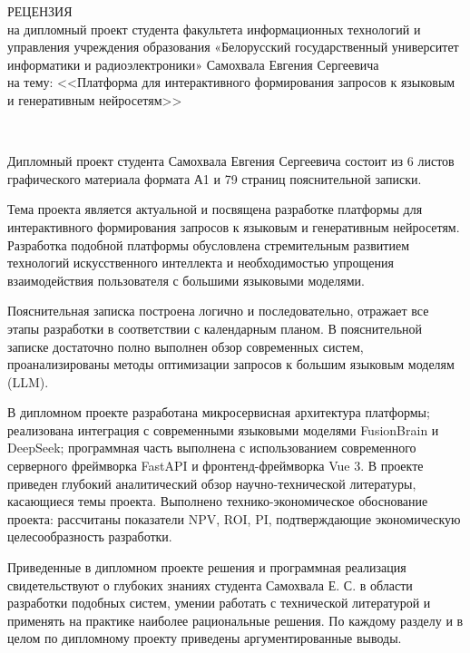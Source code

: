 \documentclass[12pt,a4paper]{article}
\begin{document}
\thispagestyle{empty}

%

{\small
  \begin{center}
    \begin{minipage}{0.9\textwidth}
      \begin{center}
        {\normalsize РЕЦЕНЗИЯ}\\[0.2cm]
на дипломный проект студента факультета информационных технологий и управления
учреждения образования «Белорусский государственный университет информатики и радиоэлектроники»
        Самохвала Евгения Сергеевича\\ на тему: <<Платформа для интерактивного формирования запросов к языковым и генеративным нейросетям>>
      \end{center}
    \end{minipage}\\
  \end{center}

Дипломный проект студента Самохвала Евгения Сергеевича состоит из 6 листов графического материала формата А1 и 79 страниц пояснительной записки.

Тема проекта является актуальной и посвящена разработке платформы для интерактивного формирования запросов к языковым и генеративным нейросетям. Разработка подобной платформы обусловлена стремительным развитием технологий искусственного интеллекта и необходимостью упрощения взаимодействия пользователя с большими языковыми моделями.

Пояснительная записка построена логично и последовательно, отражает все этапы разработки в соответствии с календарным планом. В пояснительной записке достаточно полно выполнен обзор современных систем, проанализированы методы оптимизации запросов к большим языковым моделям (LLM).

В дипломном проекте разработана микросервисная архитектура платформы; реализована интеграция с современными языковыми моделями FusionBrain и DeepSeek; программная часть выполнена с использованием современного серверного фреймворка FastAPI и фронтенд-фреймворка Vue 3. В проекте приведен глубокий аналитический обзор научно-технической литературы, касающиеся темы проекта. Выполнено технико-экономическое обоснование проекта: рассчитаны показатели NPV, ROI, PI, подтверждающие экономическую целесообразность разработки.

Приведенные в дипломном проекте решения и программная реализация свидетельствуют о глубоких знаниях студента Самохвала Е. С. в области разработки подобных систем, умении работать с технической литературой и применять на практике наиболее рациональные решения. По каждому разделу и в целом по дипломному проекту приведены аргументированные выводы.

}
\end{document}
